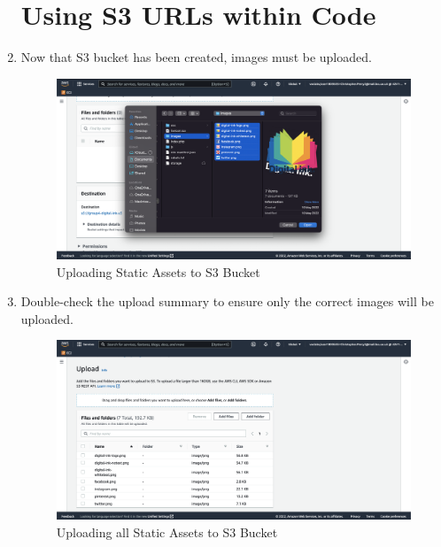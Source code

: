 \begin{enumerate}
    \section{Using S3 URLs within Code}


    \item Now that S3 bucket has been created, images must be uploaded.\nolinebreak
        \begin{figure}[H]
            \centering
            \includegraphics[width=\textwidth]{resources/s3/s3-image-upload.png}
            \caption{Uploading Static Assets to S3 Bucket}
            \label{fig:s3-image-upload}
        \end{figure}


    \item Double-check the upload summary to ensure only the correct images will be uploaded.\nolinebreak
        \begin{figure}[H]
            \centering
            \includegraphics[width=\textwidth]{resources/s3/s3-upload-summary.png}
            \caption{Uploading all Static Assets to S3 Bucket}
            \label{fig:s3-upload-summary}
        \end{figure}


\end{enumerate}
